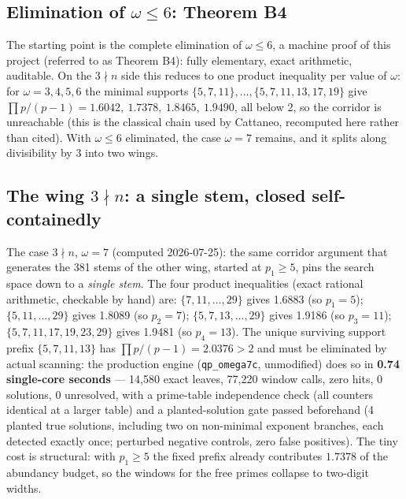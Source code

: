 \documentclass[11pt]{article}
\theoremstyle{remark}
\begin{document}
\subsection{Elimination of $\omega \le 6$: Theorem B4}\label{sec:b4}

The starting point is the complete elimination of $\omega \le 6$, a machine proof of this project (referred to as Theorem B4): fully elementary, exact arithmetic, auditable. On the $3 \nmid n$ side this reduces to one product inequality per value of $\omega$: for $\omega = 3, 4, 5, 6$ the minimal supports $\{5,7,11\}, \dots, \{5,7,11,13,17,19\}$ give $\prod p/(p-1) = 1.6042,\ 1.7378,\ 1.8465,\ 1.9490$, all below 2, so the corridor is unreachable (this is the classical chain used by Cattaneo, recomputed here rather than cited). With $\omega \le 6$ eliminated, the case $\omega = 7$ remains, and it splits along divisibility by 3 into two wings.

\subsection{The wing $3 \nmid n$: a single stem, closed self-containedly}\label{sec:nothree}

The case $3 \nmid n$, $\omega = 7$ (computed 2026-07-25): the same corridor argument that generates the 381 stems of the other wing, started at $p_1 \ge 5$, pins the search space down to a \emph{single stem}. The four product inequalities (exact rational arithmetic, checkable by hand) are: $\{7,11,\dots,29\}$ gives 1.6883 (so $p_1 = 5$); $\{5,11,\dots,29\}$ gives 1.8089 (so $p_2 = 7$); $\{5,7,13,\dots,29\}$ gives 1.9186 (so $p_3 = 11$); $\{5,7,11,17,19,23,29\}$ gives 1.9481 (so $p_4 = 13$). The unique surviving support prefix $\{5,7,11,13\}$ has $\prod p/(p-1) = 2.0376 > 2$ and must be eliminated by actual scanning: the production engine (\texttt{qp\_omega7c}, unmodified) does so in \textbf{0.74 single-core seconds} --- 14,580 exact leaves, 77,220 window calls, zero hits, 0 solutions, 0 unresolved, with a prime-table independence check (all counters identical at a larger table) and a planted-solution gate passed beforehand (4 planted true solutions, including two on non-minimal exponent branches, each detected exactly once; perturbed negative controls, zero false positives). The tiny cost is structural: with $p_1 \ge 5$ the fixed prefix already contributes $1.7378$ of the abundancy budget, so the windows for the free primes collapse to two-digit widths.
\end{document}
